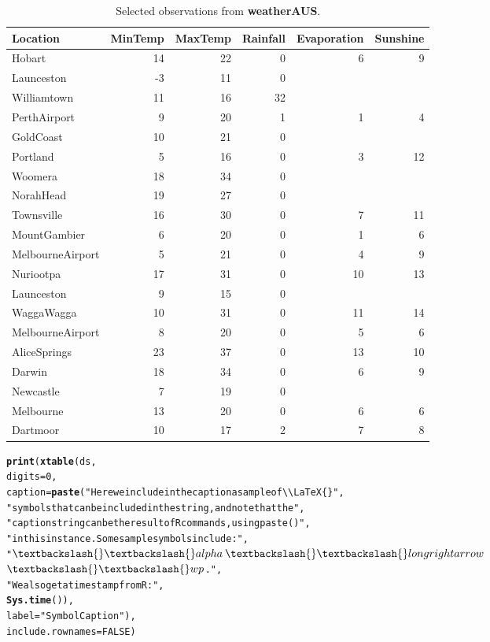 \documentclass[a4paper]{article}\usepackage[]{graphicx}\usepackage[]{color}
\makeatletter
\newcommand{\hlnum}[1]{\textcolor[rgb]{0.686,0.059,0.569}{#1}}%
\newcommand{\hlstr}[1]{\textcolor[rgb]{0.192,0.494,0.8}{#1}}%
\newcommand{\hlstd}[1]{\textcolor[rgb]{0.345,0.345,0.345}{#1}}%
\newcommand{\hlkwc}[1]{\textcolor[rgb]{0.333,0.667,0.333}{#1}}%
\newcommand{\hlkwd}[1]{\textcolor[rgb]{0.737,0.353,0.396}{\textbf{#1}}}%
\newenvironment{kframe}{%
 \def\at@end@of@kframe{}%
 \ifinner\ifhmode%
  \def\at@end@of@kframe{\end{minipage}}%
  \begin{minipage}{\columnwidth}%
 \fi\fi%
 \def\FrameCommand##1{\hskip\@totalleftmargin \hskip-\fboxsep
 \colorbox{shadecolor}{##1}\hskip-\fboxsep
     \hskip-\linewidth \hskip-\@totalleftmargin \hskip\columnwidth}%
 \MakeFramed {\advance\hsize-\width
   \@totalleftmargin\z@ \linewidth\hsize
   \@setminipage}}%
 {\par\unskip\endMakeFramed%
 \at@end@of@kframe}
\makeatother
\begin{document}
\begin{table}[ht]
\centering
\begin{tabular}{lrrrrr}
  \hline
Location & MinTemp & MaxTemp & Rainfall & Evaporation & Sunshine \\ 
  \hline
Hobart & 14 & 22 & 0 & 6 & 9 \\ 
  Launceston & -3 & 11 & 0 &  &  \\ 
  Williamtown & 11 & 16 & 32 &  &  \\ 
  PerthAirport & 9 & 20 & 1 & 1 & 4 \\ 
  GoldCoast & 10 & 21 & 0 &  &  \\ 
  Portland & 5 & 16 & 0 & 3 & 12 \\ 
  Woomera & 18 & 34 & 0 &  &  \\ 
  NorahHead & 19 & 27 & 0 &  &  \\ 
  Townsville & 16 & 30 & 0 & 7 & 11 \\ 
  MountGambier & 6 & 20 & 0 & 1 & 6 \\ 
  MelbourneAirport & 5 & 21 & 0 & 4 & 9 \\ 
  Nuriootpa & 17 & 31 & 0 & 10 & 13 \\ 
  Launceston & 9 & 15 & 0 &  &  \\ 
  WaggaWagga & 10 & 31 & 0 & 11 & 14 \\ 
  MelbourneAirport & 8 & 20 & 0 & 5 & 6 \\ 
  AliceSprings & 23 & 37 & 0 & 13 & 10 \\ 
  Darwin & 18 & 34 & 0 & 6 & 9 \\ 
  Newcastle & 7 & 19 & 0 &  &  \\ 
  Melbourne & 13 & 20 & 0 & 6 & 6 \\ 
  Dartmoor & 10 & 17 & 2 & 7 & 8 \\ 
   \hline
\end{tabular}
\caption{Selected observations from \textbf{weatherAUS}.} 
\label{MyTable}
\end{table}
\begin{kframe}\begin{alltt}
\hlkwd{print}\hlstd{(}\hlkwd{xtable}\hlstd{(ds,}
\hlkwc{digits}\hlstd{=}\hlnum{0}\hlstd{,}
\hlkwc{caption}\hlstd{=}\hlkwd{paste}\hlstd{(}\hlstr{"Here we include in the caption a sample of \textbackslash{}\textbackslash{}LaTeX\{\}"}\hlstd{,}
\hlstr{"symbols that can be included in the string, and note that the"}\hlstd{,}
\hlstr{"caption string can be the result of R commands, using paste()"}\hlstd{,}
\hlstr{"in this instance. Some sample symbols include:"}\hlstd{,}
\hlstr{"$\textbackslash{}\textbackslash{}alpha$ $\textbackslash{}\textbackslash{}longrightarrow$ $\textbackslash{}\textbackslash{}wp$."}\hlstd{,}
\hlstr{"We also get a timestamp from R:"}\hlstd{,}
\hlkwd{Sys.time}\hlstd{()),}
\hlkwc{label}\hlstd{=}\hlstr{"SymbolCaption"}\hlstd{),}
\hlkwc{include.rownames}\hlstd{=}\hlnum{FALSE}\hlstd{)}
\end{alltt}
\end{kframe}%
\end{document}
